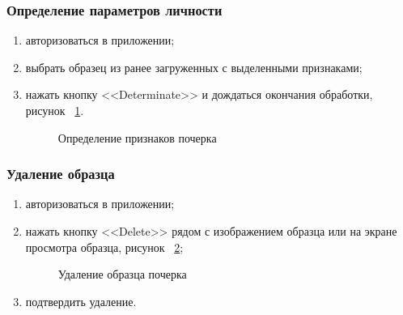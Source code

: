 \subsubsection{Определение параметров личности}
\label{sec:manpage:client_man:determ_nature}
\begin{enumerate}
    \item авторизоваться в приложении;
    \item выбрать образец из ранее загруженных с выделенными признаками;
    \item нажать кнопку <<Determinate>> и дождаться окончания обработки, рисунок ~\ref{fig:manpage:client_man:determinate_nature}.
        \begin{figure}[ht]
            \centering
            \caption{Определение признаков почерка}
            \label{fig:manpage:client_man:determinate_nature}
        \end{figure}
\end{enumerate}

\subsubsection{Удаление образца}
\label{sec:manpage:client_man:delete_sample}
\begin{enumerate}
    \item авторизоваться в приложении;
    \item нажать кнопку <<Delete>> рядом с изображением образца или на экране просмотра образца, рисунок ~\ref{fig:manpage:client_man:delete_sample};
        \begin{figure}[ht]
            \centering
            \caption{Удаление образца почерка}
            \label{fig:manpage:client_man:delete_sample}
        \end{figure}
    \item подтвердить удаление.
\end{enumerate}